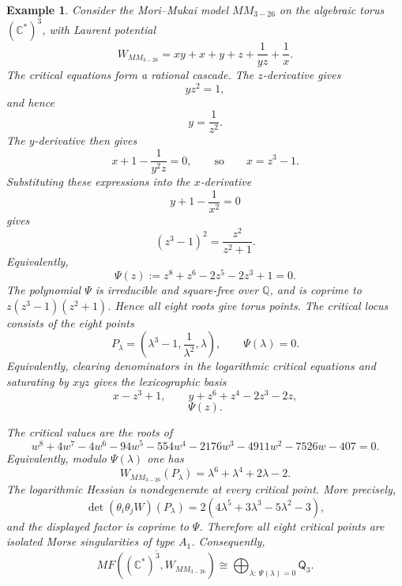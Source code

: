 \documentclass[11pt]{amsart}
\newtheorem{example}{Example}[section]
\newcommand{\MorseCat}[1]{\mathsf{Q}_{#1}}
\begin{document}
\begin{example}
Consider the Mori--Mukai model $MM_{3-26}$ on the algebraic torus
$(\mathbb{C}^*)^3$, with Laurent potential
\[
W_{MM_{3-26}}=xy+x+y+z+\frac{1}{yz}+\frac{1}{x}.
\]
The critical equations form a rational cascade. The $z$-derivative gives
\[
yz^2=1,
\]
and hence
\[
y=\frac{1}{z^2}.
\]
The $y$-derivative then gives
\[
x+1-\frac{1}{y^2z}=0,
\qquad\text{so}\qquad
x=z^3-1.
\]
Substituting these expressions into the $x$-derivative
\[
y+1-\frac{1}{x^2}=0
\]
gives
\[
(z^3-1)^2=\frac{z^2}{z^2+1}.
\]
Equivalently,
\[
\Psi(z):=z^8+z^6-2z^5-2z^3+1=0.
\]
The polynomial $\Psi$ is irreducible and square-free over $\mathbb{Q}$, and is
coprime to $z(z^3-1)(z^2+1)$. Hence all eight roots give torus points. The
critical locus consists of the eight points
\[
P_\lambda=\left(\lambda^3-1,\frac{1}{\lambda^2},\lambda\right),
\qquad
\Psi(\lambda)=0.
\]
Equivalently, clearing denominators in the logarithmic critical equations and
saturating by $xyz$ gives the lexicographic basis
\[
x-z^3+1,
\qquad
y+z^6+z^4-2z^3-2z,
\]
\[
\Psi(z).
\]

The critical values are the roots of
\[
w^8+4w^7-4w^6-94w^5-554w^4-2176w^3
-4911w^2-7526w-407=0.
\]
Equivalently, modulo $\Psi(\lambda)$ one has
\[
W_{MM_{3-26}}(P_\lambda)=\lambda^6+\lambda^4+2\lambda-2.
\]
The logarithmic Hessian is nondegenerate at every critical point. More
precisely,
\[
\det(\theta_i\theta_jW)(P_\lambda)
=2(4\lambda^5+3\lambda^3-5\lambda^2-3),
\]
and the displayed factor is coprime to $\Psi$. Therefore all eight critical
points are isolated Morse singularities of type $A_1$. Consequently,
\[
\overline{MF((\mathbb{C}^*)^3,W_{MM_{3-26}})}
\cong \bigoplus_{\lambda:\,\Psi(\lambda)=0}\MorseCat{3}.
\]
\end{example}
\end{document}
